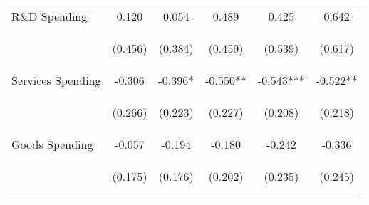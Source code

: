 \begin{tabular}{lccccc}
    R\&D Spending & 0.120 & 0.054 & 0.489 & 0.425 & 0.642 \\
    \vspace{4pt} & \begin{footnotesize}(0.456)\end{footnotesize} & \begin{footnotesize}(0.384)\end{footnotesize} & \begin{footnotesize}(0.459)\end{footnotesize} & \begin{footnotesize}(0.539)\end{footnotesize} & \begin{footnotesize}(0.617)\end{footnotesize} \\
    Services Spending & -0.306 & -0.396* & -0.550** & -0.543*** & -0.522** \\
    \vspace{4pt} & \begin{footnotesize}(0.266)\end{footnotesize} & \begin{footnotesize}(0.223)\end{footnotesize} & \begin{footnotesize}(0.227)\end{footnotesize} & \begin{footnotesize}(0.208)\end{footnotesize} & \begin{footnotesize}(0.218)\end{footnotesize} \\
    Goods Spending & -0.057 & -0.194 & -0.180 & -0.242 & -0.336 \\
     & \begin{footnotesize}(0.175)\end{footnotesize} & \begin{footnotesize}(0.176)\end{footnotesize} & \begin{footnotesize}(0.202)\end{footnotesize} & \begin{footnotesize}(0.235)\end{footnotesize} & \begin{footnotesize}(0.245)\end{footnotesize} \\


\end{tabular}
